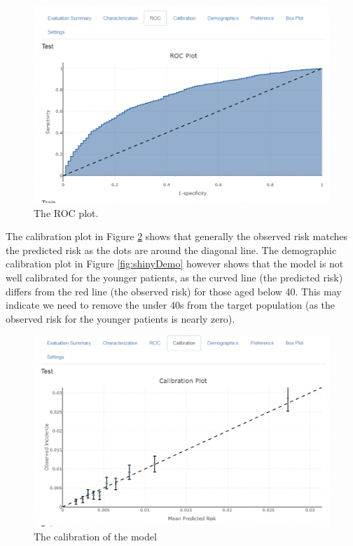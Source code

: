 \documentclass[11pt]{book}
\theoremstyle{definition}
\theoremstyle{definition}
\theoremstyle{definition}
\theoremstyle{remark}
\begin{document}
\begin{figure}

{\centering \includegraphics[width=1\linewidth]{images/PatientLevelPrediction/shiny/singleShiny/singleShinyRoc} 

}

\caption{The ROC plot.}\label{fig:shinyROC}
\end{figure}

The calibration plot in Figure \ref{fig:shinyCal} shows that generally
the observed risk matches the predicted risk as the dots are around the
diagonal line. The demographic calibration plot in Figure
\ref{fig:shinyDemo} however shows that the model is not well calibrated
for the younger patients, as the curved line (the predicted risk)
differs from the red line (the observed risk) for those aged below 40.
This may indicate we need to remove the under 40s from the target
population (as the observed risk for the younger patients is nearly
zero).

\begin{figure}

{\centering \includegraphics[width=1\linewidth]{images/PatientLevelPrediction/shiny/singleShiny/singleShinyCal} 

}

\caption{The calibration of the model}\label{fig:shinyCal}
\end{figure}
\end{document}
